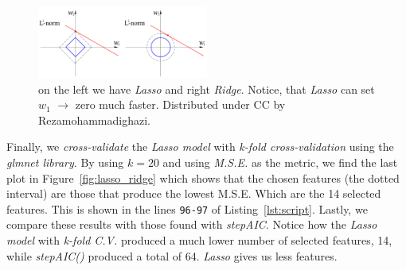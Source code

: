 \documentclass[a4paper, twocolumn]{article}
\begin{document}
    \begin{figure}[h!]
        \centering
        \caption{on the left we have \emph{Lasso} and right \emph{Ridge}. Notice, that \emph{Lasso} can set $w_1$ $\rightarrow$ zero much faster. Distributed under CC by Rezamohammadighazi.}
        \label{fig:shape}
        \includegraphics[width=0.5\textwidth]
        {share/shape.jpg}
    \end{figure}

    Finally, we \emph{cross-validate} the \emph{Lasso model} with \emph{k-fold cross-validation} using the \emph{glmnet library}. By using $k = 20$ and using \emph{M.S.E.} as the metric, we find the last plot in Figure~\ref{fig:lasso_ridge} which shows that the chosen features (the dotted interval) are those that produce the lowest M.S.E. Which are the 14 selected features. This is shown in the lines \texttt{96-97} of Listing~\ref{lst:script}. Lastly, we compare these results with those found with \emph{stepAIC}. Notice how the \emph{Lasso model} with \emph{k-fold C.V.} produced a much lower number of selected features, 14, while \emph{stepAIC()} produced a total of 64. \emph{Lasso} gives us less features.

    \newpage
\end{document}

